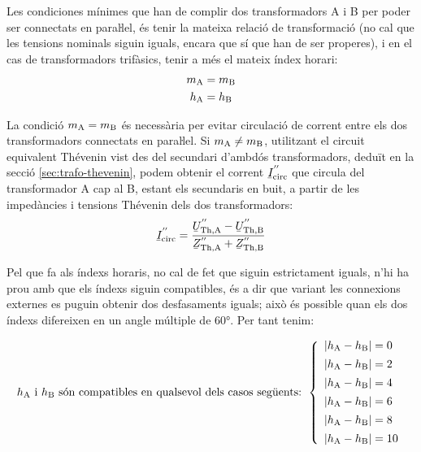 Les condiciones mínimes que han de complir dos transformadors A i B per poder ser connectats en paraŀlel, és tenir la mateixa relació de transformació (no cal que les tensions nominals siguin iguals, encara que sí que han de ser properes), i en el cas de transformadors trifàsics, tenir a més el mateix índex horari:
\begin{align}
    m_\mathrm{A} &= m_\mathrm{B}\\
    h_\mathrm{A} &= h_\mathrm{B}
\end{align}

La condició $m_\mathrm{A} = m_\mathrm{B}$ és necessària per evitar circulació de corrent entre els dos transformadors connectats en paraŀlel. Si $m_\mathrm{A} \neq m_\mathrm{B}$, utilitzant el circuit equivalent  Thévenin vist des del secundari d'ambdós transformadors, deduït en la secció \vref{sec:trafo-thevenin}, podem obtenir el corrent $\cmplx{I}\ped{circ}^{''}$ que circula del transformador A cap al B, estant els secundaris en buit, a partir de les impedàncies i tensions Thévenin dels dos transformadors:
\begin{equation}
    \cmplx{I}\ped{circ}^{''} = \frac{\cmplx{U}\ped{Th,A}^{''}-\cmplx{U}\ped{Th,B}^{''}}{\cmplx{Z}\ped{Th,A}^{''}+
    \cmplx{Z}\ped{Th,B}^{''}}
\end{equation}

Pel que fa als índexs horaris, no cal de fet que siguin estrictament iguals, n'hi ha prou amb que els índexs siguin compatibles, és a dir que variant les connexions externes es puguin obtenir dos desfasaments iguals; això és possible quan els dos índexs difereixen en un angle múltiple de \ang{60}. Per tant tenim:

\begin{equation}
    h_\mathrm{A} \text{ i } h_\mathrm{B} \text{ són compatibles en qualsevol dels casos següents: }
    \left\{
        \begin{array}{l}
           |h_\mathrm{A} - h_\mathrm{B}| = 0 \\[1ex]
           |h_\mathrm{A} - h_\mathrm{B}| = 2 \\[1ex]
           |h_\mathrm{A} - h_\mathrm{B}| = 4 \\[1ex]
           |h_\mathrm{A} - h_\mathrm{B}| = 6 \\[1ex]
           |h_\mathrm{A} - h_\mathrm{B}| = 8 \\[1ex]
           |h_\mathrm{A} - h_\mathrm{B}| = 10
        \end{array}
    \right.
    \label{eq:index_comp}
\end{equation}


